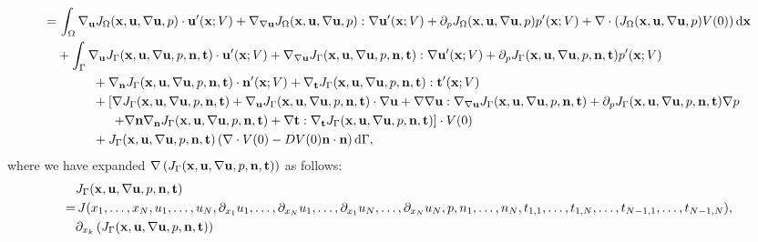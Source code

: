 \documentclass[oneside]{book}
\numberwithin{equation}{section}
\begin{document}
\begin{enumerate}[leftmargin=0in]
\begin{align*}
        =&\, \int_\Omega \nabla_{\bf u}J_\Omega({\bf x},{\bf u},\nabla{\bf u},p)\cdot{\bf u}'({\bf x};V) + \nabla_{\nabla{\bf u}}J_\Omega({\bf x},{\bf u},\nabla{\bf u},p):\nabla{\bf u}'({\bf x};V) + \partial_pJ_\Omega({\bf x},{\bf u},\nabla{\bf u},p)p'({\bf x};V) + \nabla\cdot\left(J_\Omega({\bf x},{\bf u},\nabla{\bf u},p)V(0)\right){\rm d}{\bf x}\\
        &+ \int_\Gamma \nabla_{\bf u}J_\Gamma({\bf x},{\bf u},\nabla{\bf u},p,{\bf n},{\bf t})\cdot{\bf u}'({\bf x};V) + \nabla_{\nabla{\bf u}}J_\Gamma({\bf x},{\bf u},\nabla{\bf u},p,{\bf n},{\bf t}):\nabla{\bf u}'({\bf x};V) + \partial_pJ_\Gamma({\bf x},{\bf u},\nabla{\bf u},p,{\bf n},{\bf t})p'({\bf x};V)\\
        &\hspace{1cm}+ \nabla_{\bf n}J_\Gamma({\bf x},{\bf u},\nabla{\bf u},p,{\bf n},{\bf t})\cdot{\bf n}'({\bf x};V) + \nabla_{\bf t}J_\Gamma({\bf x},{\bf u},\nabla{\bf u},p,{\bf n},{\bf t}):{\bf t}'({\bf x};V)\\
        &\hspace{1cm}+ \left[\nabla J_\Gamma({\bf x},{\bf u},\nabla{\bf u},p,{\bf n},{\bf t}) + \nabla_{\bf u}J_\Gamma({\bf x},{\bf u},\nabla{\bf u},p,{\bf n},{\bf t})\cdot\nabla{\bf u} + \nabla\nabla{\bf u}:\nabla_{\nabla{\bf u}}J_\Gamma({\bf x},{\bf u},\nabla{\bf u},p,{\bf n},{\bf t}) + \partial_pJ_\Gamma({\bf x},{\bf u},\nabla{\bf u},p,{\bf n},{\bf t})\nabla p\right.\\
        &\hspace{15mm} \left.+ \nabla{\bf n}\nabla_{\bf n}J_\Gamma({\bf x},{\bf u},\nabla{\bf u},p,{\bf n},{\bf t}) + \nabla{\bf t}:\nabla_{\bf t}J_\Gamma({\bf x},{\bf u},\nabla{\bf u},p,{\bf n},{\bf t})\right]\cdot V(0)\\
        &\hspace{1cm}+ J_\Gamma({\bf x},{\bf u},\nabla{\bf u},p,{\bf n},{\bf t})\left(\nabla\cdot V(0) - DV(0){\bf n}\cdot{\bf n}\right){\rm d}\Gamma,
    \end{align*}
    where we have expanded $\nabla\left(J_\Gamma({\bf x},{\bf u},\nabla{\bf u},p,{\bf n},{\bf t})\right)$ as follows:
    \begin{align*}
        &J_\Gamma({\bf x},{\bf u},\nabla{\bf u},p,{\bf n},{\bf t})\\
        =&\, J(x_1,\ldots,x_N,u_1,\ldots,u_N,\partial_{x_1}u_1,\ldots,\partial_{x_N}u_1,\ldots,\partial_{x_1}u_N,\ldots,\partial_{x_N}u_N,p,n_1,\ldots,n_N,t_{1,1},\ldots,t_{1,N},\ldots,t_{N-1,1},\ldots,t_{N-1,N}),\\
        &\partial_{x_k}\left(J_\Gamma({\bf x},{\bf u},\nabla{\bf u},p,{\bf n},{\bf t})\right)\\

\end{align*}
\end{enumerate}
\end{document}
